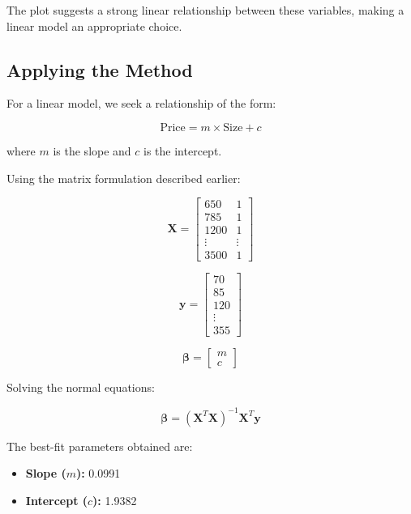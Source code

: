 \documentclass[12pt]{article}
\begin{document}
The plot suggests a strong linear relationship between these variables, making a linear model an appropriate choice.

\subsection{Applying the Method}

For a linear model, we seek a relationship of the form:

\begin{equation}
\text{Price} = m \times \text{Size} + c
\end{equation}

where $m$ is the slope and $c$ is the intercept.

Using the matrix formulation described earlier:

\begin{equation}
\mathbf{X} = \begin{bmatrix} 
650 & 1 \\
785 & 1 \\
1200 & 1 \\
\vdots & \vdots \\
3500 & 1
\end{bmatrix}
\end{equation}

\begin{equation}
\mathbf{y} = \begin{bmatrix} 70 \\ 85 \\ 120 \\ \vdots \\ 355 \end{bmatrix}
\end{equation}

\begin{equation}
\boldsymbol{\beta} = \begin{bmatrix} m \\ c \end{bmatrix}
\end{equation}

Solving the normal equations:

\begin{equation}
\boldsymbol{\beta} = (\mathbf{X}^T\mathbf{X})^{-1}\mathbf{X}^T\mathbf{y}
\end{equation}

The best-fit parameters obtained are:
\begin{itemize}
    \item \textbf{Slope ($m$):} 0.0991
    \item \textbf{Intercept ($c$):} 1.9382
\end{itemize}
\end{document}
